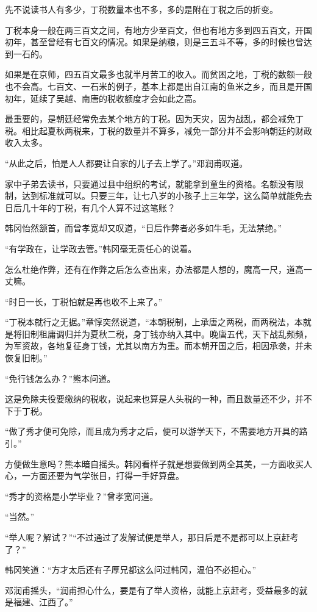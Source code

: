 先不说读书人有多少，丁税数量本也不多，多的是附在丁税之后的折变。

丁税本身一般在两三百文之间，有地方少至百文，但也有地方多到四五百文，开国初年，甚至曾经有七百文的情况。如果是纳粮，则是三五斗不等，多的时候也曾达到一石的。

如果是在京师，四五百文最多也就半月苦工的收入。而贫困之地，丁税的数额一般也不会高。七百文、一石米的例子，基本上都是出自江南的鱼米之乡，而且是开国初年，延续了吴越、南唐的税收额度才会如此之高。

最重要的，是朝廷经常免去某个地方的丁税。因为天灾，因为战乱，都会减免丁税。相比起夏秋两税来，丁税的数量并不算多，减免一部分并不会影响朝廷的财政收入太多。

“从此之后，怕是人人都要让自家的儿子去上学了。”邓润甫叹道。

家中子弟去读书，只要通过县中组织的考试，就能拿到童生的资格。名额没有限制，达到标准就可以。只要三年，让七八岁的小孩子上三年学，这么简单就能免去日后几十年的丁税，有几个人算不过这笔账？

韩冈怡然颔首，而曾孝宽却又叹道，“日后作弊者必多如牛毛，无法禁绝。”

“有学政在，让学政去管。”韩冈毫无责任心的说着。

怎么杜绝作弊，还有在作弊之后怎么查出来，办法都是人想的，魔高一尺，道高一丈嘛。

“时日一长，丁税怕就是再也收不上来了。”

“丁税本就行之无据。”章惇突然说道，“本朝税制，上承唐之两税，而两税法，本就是将旧制租庸调归并为夏秋二税，身丁钱亦纳入其中。晚唐五代，天下战乱频频，为军资故，各地复征身丁钱，尤其以南方为重。而本朝开国之后，相因承袭，并未恢复旧制。”

“免行钱怎么办？”熊本问道。

这是免除夫役要缴纳的税收，说起来也算是人头税的一种，而且数量还不少，并不下于丁税。

“做了秀才便可免除，而且成为秀才之后，便可以游学天下，不需要地方开具的路引。”

方便做生意吗？熊本暗自摇头。韩冈看样子就是想要做到两全其美，一方面收买人心，一方面还要为气学张目，打得一手好算盘。

“秀才的资格是小学毕业？”曾孝宽问道。

“当然。”

“举人呢？解试？”“不过通过了发解试便是举人，那日后是不是都可以上京赶考了？”

韩冈笑道：“方才太后还有子厚兄都这么问过韩冈，温伯不必担心。”

邓润甫摇头，“润甫担心什么，要是有了举人资格，就能上京赶考，受益最多的就是福建、江西了。”

